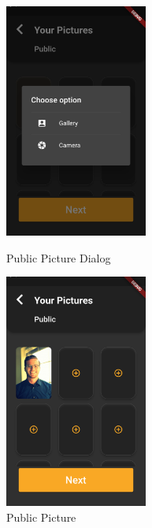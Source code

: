 \documentclass{article}
\begin{document}
\begin{figure}[!htb]
	\centering
	\begin{minipage}{.45\textwidth}
		\centering
		\includegraphics[height=7.7cm,keepaspectratio]{assets/images/ui/signup/18-public-pictures-dialog.png}
		\caption{Public Picture Dialog}
	\end{minipage}\quad
	\begin{minipage}{.45\textwidth}
		\centering
		\includegraphics[height=7.7cm,keepaspectratio]{assets/images/ui/signup/19-public-pictures-selected.png}
		\caption{Public Picture}
	\end{minipage}
\end{figure}
\end{document}
